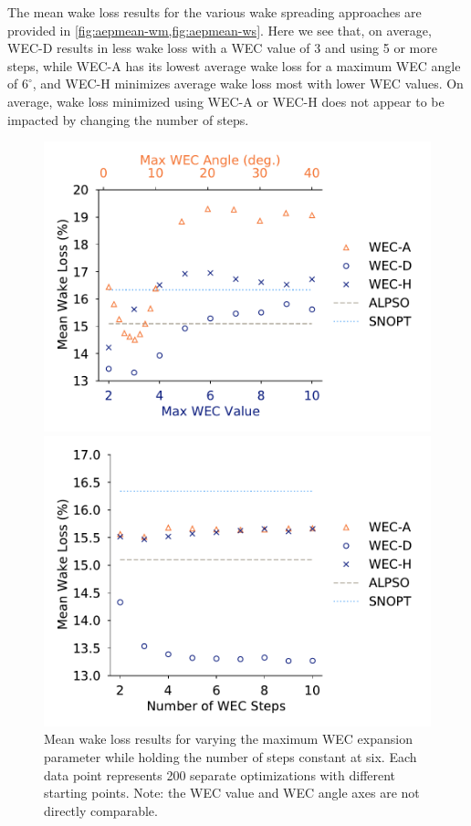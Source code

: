 \documentclass[journal abbreviation, manuscript]{copernicus}
\begin{document}
	The mean wake loss results for the various wake spreading approaches are provided in \ref{fig:aepmean-wm,fig:aepmean-ws}. Here we see that, on average, WEC-D results in less wake loss with a WEC value of 3 and using 5 or more steps, while WEC-A has its lowest average wake loss for a maximum WEC angle of $6^\circ$, and WEC-H minimizes average wake loss most with lower WEC values. On average, wake loss minimized using WEC-A or WEC-H does not appear to be impacted by changing the number of steps.
	\begin{figure}[ht]
		\centering
		\begin{minipage}[t]{0.47\textwidth}
			\centering
			\includegraphics[width=\textwidth, trim={0cm 0cm 0cm 0cm}, clip]{tests/maxwec_const_nsteps6_mean}
			\caption{Mean wake loss results for varying the maximum WEC expansion parameter while holding the number of steps constant at six. Each data point represents 200 separate optimizations with different starting points. Note: the WEC value and WEC angle axes are not directly comparable.}
			\label{fig:aepmean-wm}
		\end{minipage}\hspace{1pc}
		\begin{minipage}[t]{0.47\textwidth}
			\centering
			\includegraphics[width=\textwidth]{tests/nsteps_const_maxwec_mean}

\end{minipage}
\end{figure}
\end{document}
